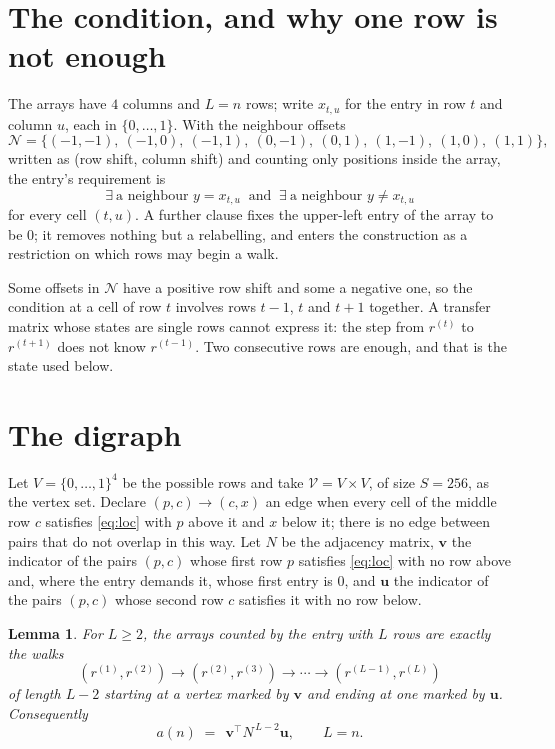 \documentclass[11pt,a4paper]{article}
\theoremstyle{plain}
\newtheorem{lemma}[theorem]{Lemma}
\theoremstyle{definition}
\begin{document}
\section{The condition, and why one row is not enough}

The arrays have $4$ columns and $L=n$ rows; write $x_{t,u}$ for the entry in
row $t$ and column $u$, each in $\{0,\dots,1\}$. With the neighbour offsets
\[
\mathcal N=\{(-1,-1),\ (-1,0),\ (-1,1),\ (0,-1),\ (0,1),\ (1,-1),\ (1,0),\ (1,1)\},
\]
written as (row shift, column shift) and counting only positions inside the array, the
entry's requirement is
\begin{equation}\label{eq:loc}
\exists\ \text{a neighbour }y=x_{t,u}\ \text{ and }\ \exists\ \text{a neighbour }y\ne x_{t,u}
\end{equation}
for every cell $(t,u)$. A further clause fixes the upper-left entry of the array to be $0$; it removes nothing but a relabelling, and enters the construction as a restriction on which rows may begin a walk.

Some offsets in $\mathcal N$ have a positive row shift and some a negative one, so the
condition at a cell of row $t$ involves rows $t-1$, $t$ and $t+1$ together. A transfer
matrix whose states are single rows cannot express it: the step from $r^{(t)}$ to
$r^{(t+1)}$ does not know $r^{(t-1)}$. Two consecutive rows are enough, and that is
the state used below.

\section{The digraph}

Let $V=\{0,\dots,1\}^{4}$ be the possible rows and take
$\mathcal V=V\times V$, of size $S=256$, as the vertex set. Declare $(p,c)\to(c,x)$ an edge
when every cell of the middle row $c$ satisfies \eqref{eq:loc} with $p$ above it and $x$
below it; there is no edge between pairs that do not overlap in this way. Let $N$ be the
adjacency matrix, $\mathbf{v}$ the indicator of the pairs $(p,c)$ whose first row $p$
satisfies \eqref{eq:loc} with no row above and, where the entry demands it, whose first entry is $0$, and $\mathbf{u}$ the indicator of
the pairs $(p,c)$ whose second row $c$ satisfies it with no row below.

\begin{lemma}\label{lem:walk}
For $L\ge2$, the arrays counted by the entry with $L$ rows are exactly the walks
\[
(r^{(1)},r^{(2)})\to(r^{(2)},r^{(3)})\to\cdots\to(r^{(L-1)},r^{(L)})
\]
of length $L-2$ starting at a vertex marked by $\mathbf{v}$ and ending at one marked by
$\mathbf{u}$. Consequently
\[
a(n)\;=\;\,\mathbf{v}^{\!\top}N^{\,L-2}\mathbf{u},\qquad L=n .
\]
\end{lemma}
\end{document}
